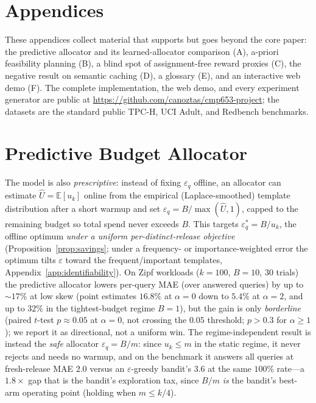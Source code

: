 \documentclass[sigconf,nonacm]{acmart}
\newcommand{\eps}{\varepsilon}
\newcommand{\E}{\mathbb{E}}
\begin{document}
\clearpage
\appendix
\section*{Appendices}
\noindent These appendices collect material that supports but goes beyond the core paper: the predictive allocator and its learned-allocator comparison (A), a-priori feasibility planning (B), a blind spot of assignment-free reward proxies (C), the negative result on semantic caching (D), a glossary (E), and an interactive web demo (F). The complete implementation, the web demo, and every experiment generator are public at \url{https://github.com/canoztas/cmp653-project}; the datasets are the standard public TPC-H, UCI Adult, and Redbench benchmarks.

\section{Predictive Budget Allocator}
\label{app:allocator}

The model is also \emph{prescriptive}: instead of fixing $\eps_q$ offline, an allocator can estimate $\hat U=\E[u_{k}]$ online from the empirical (Laplace-smoothed) template distribution after a short warmup and set $\eps_q=B/\max(\hat U,1)$, capped to the remaining budget so total spend never exceeds $B$. This targets $\eps_q^*=B/u_k$, the offline optimum \emph{under a uniform per-distinct-release objective} (Proposition~\ref{prop:savings}; under a frequency- or importance-weighted error the optimum tilts $\eps$ toward the frequent/important templates, Appendix~\ref{app:identifiability}). On Zipf workloads ($k{=}100$, $B{=}10$, 30 trials) the predictive allocator lowers per-query MAE (over answered queries) by up to $\sim$$17\%$ at low skew (point estimates $16.8\%$ at $\alpha{=}0$ down to $5.4\%$ at $\alpha{=}2$, and up to $32\%$ in the tightest-budget regime $B{=}1$), but the gain is only \emph{borderline} (paired $t$-test $p\approx0.05$ at $\alpha{=}0$, not crossing the $0.05$ threshold; $p>0.3$ for $\alpha\ge1$); we report it as directional, not a uniform win. The regime-independent result is instead the \emph{safe} allocator $\eps_q{=}B/m$: since $u_k\le m$ in the static regime, it never rejects and needs no warmup, and on the benchmark it answers all queries at fresh-release MAE $2.0$ versus an $\eps$-greedy bandit's $3.6$ at the same $100\%$ rate---a $1.8\times$ gap that is the bandit's exploration tax, since $B/m$ \emph{is} the bandit's best-arm operating point (holding when $m\le k/4$).
\end{document}
